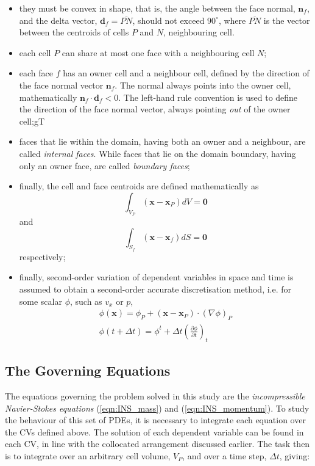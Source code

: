 \documentclass[final,3p,times,twocolumn]{elsarticle}
\begin{document}
\begin{itemize}

    \item they must be convex in shape, that is, the angle between the face normal, $\mathbf{n}_f$, and the delta vector, $\mathbf{d}_f = \overline{PN}$, should not exceed $90^{\circ}$, where $\overline{PN}$ is the vector between the centroids of cells $P$ and $N$, neighbouring cell.
    \item each cell $P$ can share at most one face with a neighbouring cell $N$;
    \item each face $f$ has an owner cell and a neighbour cell, defined by the direction of the face normal vector $\mathbf{n}_f$. The normal always points into the owner cell, mathematically $\mathbf{n}_f \cdot \mathbf{d}_f < 0$. The left-hand rule convention is used to define the direction of the face normal vector, always pointing \textit{out} of the owner cell;gT
    \item faces that lie within the domain, having both an owner and a neighbour, are called \textit{internal faces}. While faces that lie on the domain boundary, having only an owner face, are called \textit{boundary faces};
    \item finally, the cell and face centroids are defined mathematically as $$\int_{V_P} (\mathbf{x} - \mathbf{x}_P) dV = \mathbf{0}$$ and $$\int_{S_f} (\mathbf{x} - \mathbf{x}_f) dS = \mathbf{0}$$ respectively;
    \item finally, second-order variation of dependent variables in space and time is assumed to obtain a second-order accurate discretisation method, i.e. for some scalar $\phi$, such as $v_x$ or $p$, 
    \begin{gather}
        \phi(\mathbf{x}) = \phi _P + (\mathbf{x} - \mathbf{x}_P) \cdot (\nabla \phi)_P
        \label{eqn:spatial_recon}
        \\
        \phi(t+\Delta t) = \phi ^t + \Delta t \left(\frac{\partial \phi}{\partial t}\right)_t
        \label{eqn:temporal_recon}
    \end{gather}
    
\end{itemize}


\subsection{The Governing Equations}
The equations governing the problem solved in this study are the \textit{incompressible Navier-Stokes equations} (\ref{eqn:INS_mass}) and (\ref{eqn:INS_momentum}).
To study the behaviour of this set of PDEs, it is necessary to integrate each equation over the CVs defined above. The solution of each dependent variable can be found in each CV, in line with the collocated arrangement discussed earlier. The task then is to integrate over an arbitrary cell volume, $V_P$, and over a time step, $\Delta t$, giving:
\end{document}
